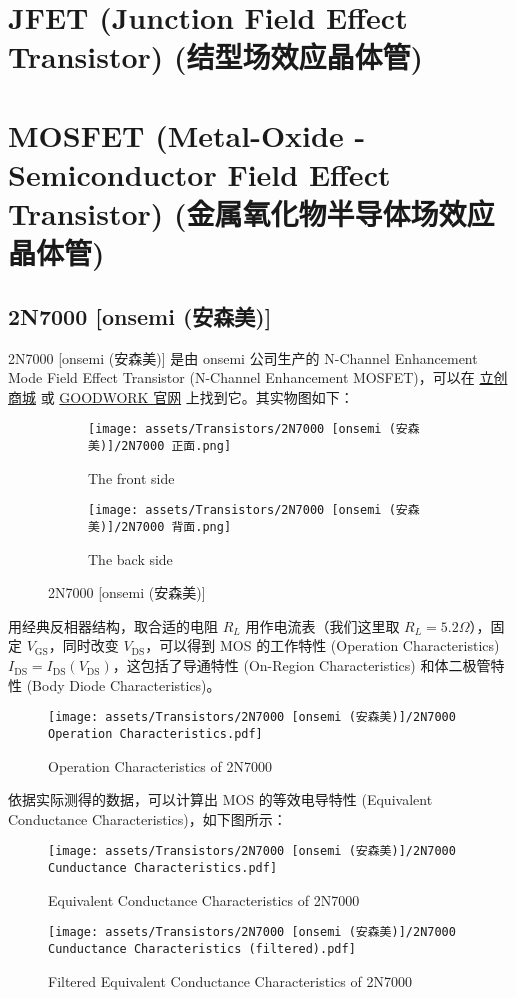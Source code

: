\documentclass[UTF8]{report}
\begin{document}
\section{JFET (Junction Field Effect Transistor) (结型场效应晶体管)}
\section{MOSFET (Metal-Oxide -Semiconductor Field Effect Transistor) (金属氧化物半导体场效应晶体管)}


\subsection{2N7000 [onsemi (安森美)]}

2N7000 [onsemi (安森美)] 是由 onsemi 公司生产的 N-Channel Enhancement Mode Field Effect Transistor (N-Channel Enhancement MOSFET)，可以在 \href{https://item.szlcsc.com/232636.html}{立创商城} 或  \href{https://www.GOODWORK.com/products/discrete-power-modules/mosfets/small-signal-mosfets/1N4007}{GOODWORK 官网} 上找到它。其实物图如下：

\begin{figure}[H]\centering
    \begin{subfigure}[b]{0.5\columnwidth}\centering
        \texttt{[image: assets/Transistors/2N7000 [onsemi (安森美)]/2N7000 正面.png]}
        \caption{The front side}
    \end{subfigure}\hfill
    \begin{subfigure}[b]{0.5\columnwidth}\centering
        \texttt{[image: assets/Transistors/2N7000 [onsemi (安森美)]/2N7000 背面.png]}
        \caption{The back side}
    \end{subfigure}
    \caption{2N7000 [onsemi (安森美)]}
\end{figure}


用经典反相器结构，取合适的电阻 $R_L$ 用作电流表（我们这里取 $R_L = 5.2 \Omega$），固定 $V_\text{GS}$，同时改变 $V_\text{DS}$，可以得到 MOS 的工作特性 (Operation Characteristics) $I_\text{DS} = I_\text{DS}(V_\text{DS})$，这包括了导通特性 (On-Region Characteristics) 和体二极管特性 (Body Diode Characteristics)。
\begin{figure}[H]\centering
    \texttt{[image: assets/Transistors/2N7000 [onsemi (安森美)]/2N7000 Operation Characteristics.pdf]}
    \caption{Operation Characteristics of 2N7000}
\end{figure}
依据实际测得的数据，可以计算出 MOS 的等效电导特性 (Equivalent Conductance Characteristics)，如下图所示：
\begin{figure}[H]\centering
    \texttt{[image: assets/Transistors/2N7000 [onsemi (安森美)]/2N7000 Cunductance Characteristics.pdf]}
    \caption{Equivalent Conductance Characteristics of 2N7000}
\end{figure}
\begin{figure}[H]\centering
    \texttt{[image: assets/Transistors/2N7000 [onsemi (安森美)]/2N7000 Cunductance Characteristics (filtered).pdf]}
    \caption{Filtered Equivalent Conductance Characteristics of 2N7000}
\end{figure}
\end{document}
